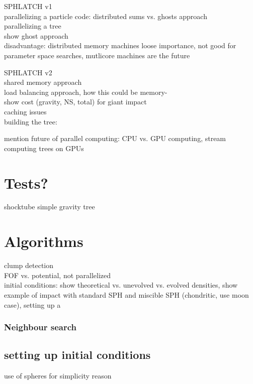 SPHLATCH v1\\
parallelizing a particle code: distributed sums vs. ghosts approach\\
parallelizing a tree\\
show ghost approach\\

disadvantage: distributed memory machines loose importance, not good for parameter space searches, mutlicore machines are the future


SPHLATCH v2\\
shared memory approach\\
load balancing approach, how this could be memory-\\
show cost (gravity, NS, total) for giant impact\\
caching issues\\

building the tree:

mention future of parallel computing: CPU vs. GPU computing, stream computing
trees on GPUs

\section{Tests?}
shocktube
simple gravity tree

\section{Algorithms}
clump detection\\
FOF vs. potential, not parallelized\\
initial conditions: show theoretical vs. unevolved vs. evolved densities, show example of impact with standard SPH and miscible SPH (chondritic, use moon case), setting up a \SSC \\

\subsubsection{Neighbour search}

\subsection{setting up initial conditions}
use of spheres for simplicity reason

\citep{Barnes:1986p2853}
\citep{Monaghan:2005p2677}
\citep{Price:2004p2613}





